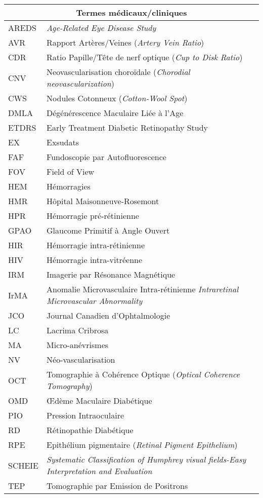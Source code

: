 \begin{longtable}{lp{5in}}
\hline
\multicolumn{2}{c}{Termes médicaux/cliniques} \\
\hline
AREDS & \textit{Age-Related Eye Disease Study} \\
AVR & Rapport Artères/Veines (\textit{Artery Vein Ratio}) \\
CDR & Ratio Papille/Tête de nerf optique (\textit{Cup to Disk Ratio}) \\
CNV & Neovascularisation choroïdale (\textit{Chorodial neovascularization}) \\
CWS & Nodules Cotonneux (\textit{Cotton-Wool Spot}) \\
DMLA & Dégénérescence Maculaire Liée à l'Age \\
ETDRS & Early Treatment Diabetic Retinopathy Study \\
EX & Exsudats \\
FAF & Fundoscopie par Autofluorescence \\
FOV & Field of View \\
HEM & Hémorragies \\
HMR & Hôpital Maisonneuve-Rosemont \\
HPR & Hémorragie pré-rétinienne \\
GPAO & Glaucome Primitif à Angle Ouvert \\

HIR & Hémorragie intra-rétinienne \\
HIV & Hémorragie intra-vitréenne \\
IRM & Imagerie par Résonance Magnétique \\
IrMA & Anomalie Microvasculaire Intra-rétinienne \textit{Intraretinal Microvascular Abnormality}\\
JCO & Journal Canadien d'Ophtalmologie \\

LC & Lacrima Cribrosa \\
MA & Micro-anévrismes \\
NV & Néo-vascularisation \\
OCT & Tomographie à Cohérence Optique (\textit{Optical Coherence Tomography}) \\
OMD        & \OE{}dème Maculaire Diabétique \\

PIO & Pression Intraoculaire \\
RD   & Rétinopathie Diabétique\\
RPE  & Epithélium pigmentaire (\textit{Retinal Pigment Epithelium}) \\
SCHEIE & \textit{Systematic Classification of Humphrey visual fields-Easy Interpretation and Evaluation} \\
TEP & Tomographie par Emission de Positrons \\
\hline


\end{longtable}

